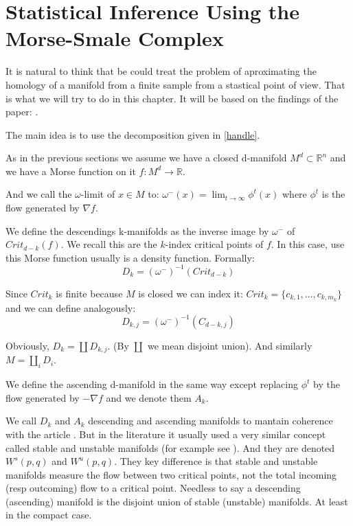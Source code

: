 \chapter{Statistical Inference Using the
Morse-Smale Complex}

It is natural to think that be could treat the problem
of aproximating the homology of a manifold from a finite 
sample from a stastical point of view. 
That is what we will try to do in this chapter. It will be based on the findings of the paper: \cite{che2017}.

The main idea is to use the decomposition given in \ref{handle}.

As in the previous sections we assume we have a closed d-manifold $M^d\subset \mathbb{R}^n$
and we have a Morse function on it $f:M^d\rightarrow \mathbb{R}$.

And we call the $\omega$-limit of $x\in M$ to:
$\omega^-(x)=\displaystyle\lim_{t\to \infty} \phi^t(x)$ where $\phi^t$ is 
the flow generated by $\nabla f$.

We define the descendings k-manifolds as the inverse image by $\omega^-$ of $Crit_{d-k}(f)$. 
We recall this are the $k$-index critical points of $f$.
In this case, use this Morse function usually is a density function.
Formally:
$$
D_k=
(\omega^-)^{-1}(Crit_{d-k})
$$

Since $Crit_k$ is finite because $M$ is closed we can index it:
$Crit_k=\{c_{k,1},\ldots,c_{k,m_k}\}$ and we can define analogously:
$$
D_{k,j}=
(\omega^-)^{-1}(C_{d-k,j})
$$

Obviously, $D_k=\coprod D_{k,j}$. (By $\coprod$ we mean disjoint union). And similarly
$M=\coprod_i D_i$.

We define the ascending d-manifold in the same way except replacing $\phi^t$ by the flow generated by $-\nabla f$
and we denote them $A_k$.

\begin{remark}
We call $D_k$ and $A_k$
descending and ascending manifolds to mantain coherence with the article \cite{che2017}.
But in the literature it usually used a very similar concept called stable and unstable manifolds (for example
see \cite{che2014}).
And they are denoted $W^s(p,q)$ and $W^u(p,q)$.
They key difference is that stable and unstable manifolds measure the flow between two critical points, not the total
incoming (resp outcoming) flow to a critical point. Needless to say a descending (ascending) manifold is the disjoint 
union of stable (unstable) manifolds.
At least in the compact case.
\end{remark}

